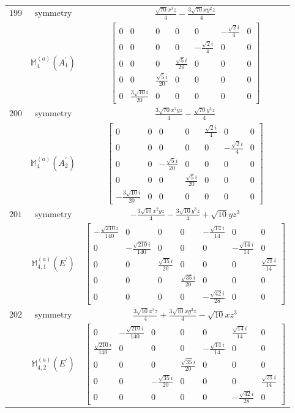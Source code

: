 \documentclass[fleqn,8pt,landscape]{jsarticle}
\begin{document}
\begin{longtable}{ccc}
$ 199 $ & $ \text{symmetry} $ & $ \frac{\sqrt{70} x^{3} z}{4} - \frac{3 \sqrt{70} x y^{2} z}{4} $ \\
$  $ & $ \mathbb{M}_{4}^{(a)}(A_{1}^{\prime}) $ & $ \begin{bmatrix} 0 & 0 & 0 & 0 & 0 & - \frac{\sqrt{2} i}{4} & 0 \\ 0 & 0 & 0 & 0 & - \frac{\sqrt{2} i}{4} & 0 & 0 \\ 0 & 0 & 0 & \frac{\sqrt{5} i}{20} & 0 & 0 & 0 \\ 0 & 0 & \frac{\sqrt{5} i}{20} & 0 & 0 & 0 & 0 \\ 0 & \frac{3 \sqrt{10} i}{20} & 0 & 0 & 0 & 0 & 0 \end{bmatrix} $ \\ \hline
$ 200 $ & $ \text{symmetry} $ & $ \frac{3 \sqrt{70} x^{2} y z}{4} - \frac{\sqrt{70} y^{3} z}{4} $ \\
$  $ & $ \mathbb{M}_{4}^{(a)}(A_{2}^{\prime}) $ & $ \begin{bmatrix} 0 & 0 & 0 & 0 & \frac{\sqrt{2} i}{4} & 0 & 0 \\ 0 & 0 & 0 & 0 & 0 & - \frac{\sqrt{2} i}{4} & 0 \\ 0 & 0 & - \frac{\sqrt{5} i}{20} & 0 & 0 & 0 & 0 \\ 0 & 0 & 0 & \frac{\sqrt{5} i}{20} & 0 & 0 & 0 \\ - \frac{3 \sqrt{10} i}{20} & 0 & 0 & 0 & 0 & 0 & 0 \end{bmatrix} $ \\ \hline
$ 201 $ & $ \text{symmetry} $ & $ - \frac{3 \sqrt{10} x^{2} y z}{4} - \frac{3 \sqrt{10} y^{3} z}{4} + \sqrt{10} y z^{3} $ \\
$  $ & $ \mathbb{M}_{4,1}^{(a)}(E^{\prime}) $ & $ \begin{bmatrix} - \frac{\sqrt{210} i}{140} & 0 & 0 & 0 & - \frac{\sqrt{14} i}{14} & 0 & 0 \\ 0 & - \frac{\sqrt{210} i}{140} & 0 & 0 & 0 & - \frac{\sqrt{14} i}{14} & 0 \\ 0 & 0 & \frac{\sqrt{35} i}{20} & 0 & 0 & 0 & \frac{\sqrt{21} i}{14} \\ 0 & 0 & 0 & \frac{\sqrt{35} i}{20} & 0 & 0 & 0 \\ 0 & 0 & 0 & 0 & - \frac{\sqrt{42} i}{28} & 0 & 0 \end{bmatrix} $ \\ \hline
$ 202 $ & $ \text{symmetry} $ & $ \frac{3 \sqrt{10} x^{3} z}{4} + \frac{3 \sqrt{10} x y^{2} z}{4} - \sqrt{10} x z^{3} $ \\
$  $ & $ \mathbb{M}_{4,2}^{(a)}(E^{\prime}) $ & $ \begin{bmatrix} 0 & - \frac{\sqrt{210} i}{140} & 0 & 0 & 0 & \frac{\sqrt{14} i}{14} & 0 \\ \frac{\sqrt{210} i}{140} & 0 & 0 & 0 & - \frac{\sqrt{14} i}{14} & 0 & 0 \\ 0 & 0 & 0 & \frac{\sqrt{35} i}{20} & 0 & 0 & 0 \\ 0 & 0 & - \frac{\sqrt{35} i}{20} & 0 & 0 & 0 & \frac{\sqrt{21} i}{14} \\ 0 & 0 & 0 & 0 & 0 & - \frac{\sqrt{42} i}{28} & 0 \end{bmatrix} $ \\ \hline

\end{longtable}
\end{document}
